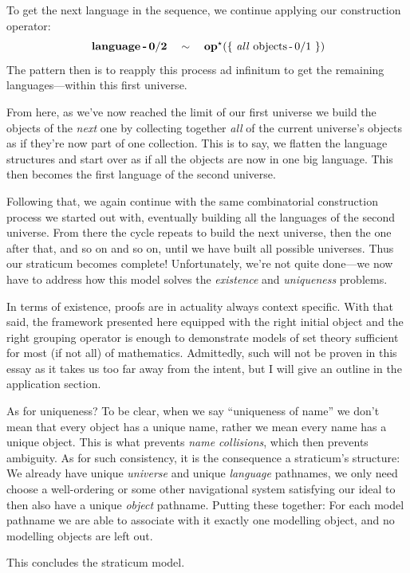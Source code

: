 \documentclass[twoside]{article}
\newcommand{\bfmbox}[1]{\mbox{\bfseries #1}}
\newcommand{\tab}[1][1.125cm]{\hspace{#1}}
\begin{document}
To get the next language in the sequence, we continue applying our construction operator:
$$ \tab[0.5ex] \bfmbox{language\,-}\,\bf{0/2} \quad\sim\quad \bfmbox{op}^\star(\{\ \mbox{\emph{all} objects\,-$\,0/1$}\ \}) $$
The pattern then is to reapply this process ad infinitum to get the remaining languages---within this first universe.

From here, as we've now reached the limit of our first universe we build the objects of the \emph{next} one by collecting
together \emph{all} of the current universe's objects as if they're now part of one collection. This is to say, we flatten
the language structures and start over as if all the objects are now in one big language. This then becomes the first language
of the second universe.

Following that, we again continue with the same combinatorial construction process we started out with, eventually building
all the languages of the second universe. From there the cycle repeats to build the next universe, then the one after that,
and so on and so on, until we have built all possible universes. Thus our straticum becomes complete! Unfortunately, we're
not quite done---we now have to address how this model solves the \emph{existence} and \emph{uniqueness} problems.

In terms of existence, proofs are in actuality always context specific. With that said, the framework presented here
equipped with the right initial object and the right grouping operator is enough to demonstrate models of set theory
sufficient for most (if not all) of mathematics. Admittedly, such will not be proven in this essay as it takes us
too far away from the intent, but I will give an outline in the application section.

As for uniqueness? To be clear, when we say ``uniqueness of name'' we don't mean that every object has a unique name,
rather we mean every name has a unique object. This is what prevents \emph{name collisions}, which then prevents ambiguity.
As for such consistency, it is the consequence a straticum's structure: We already have unique \emph{universe} and unique
\emph{language} pathnames, we only need choose a well-ordering or some other navigational system satisfying our ideal
to then also have a unique \emph{object} pathname. Putting these together: For each model pathname we are able to
associate with it exactly one modelling object, and no modelling objects are left out.

This concludes the straticum model.
\end{document}
